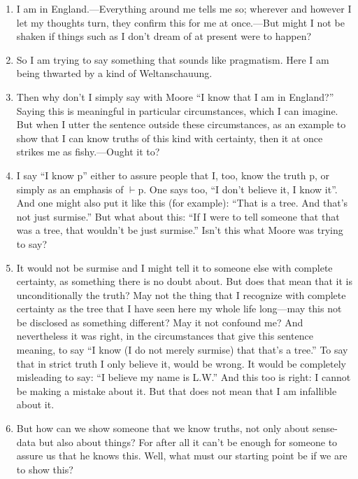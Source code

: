 \documentclass{book}
\begin{document}
\begin{enumerate}
\item
I am in England.---Everything around me tells me so; wherever and however I let
my thoughts turn, they confirm this for me at once.---But might I not be shaken
if things such as I don't dream of at present were to happen?

\item
So I am trying to say something that sounds like pragmatism.  Here I am being
thwarted by a kind of Weltanschauung.

\item
Then why don't I simply say with Moore ``I know that I am in England?'' Saying
this is meaningful in particular circumstances, which I can imagine. But when I
utter the sentence outside these circumstances, as an example to show that I
can know truths of this kind with certainty, then it at once strikes me as
fishy.---Ought it to?

\item
I say ``I know p'' either to assure people that I, too, know the truth p, or
simply as an emphasis of $\vdash$p. One says too, ``I don't believe it, I know
it''.  And one might also put it like this (for example): ``That is a tree. And
that's not just surmise.'' But what about this: ``If I were to tell someone
that that was a tree, that wouldn't be just surmise.'' Isn't this what Moore
was trying to say?

\item
It would not be surmise and I might tell it to someone else with complete
certainty, as something there is no doubt about. But does that mean that it is
unconditionally the truth? May not the thing that I recognize with complete
certainty as the tree that I have seen here my whole life long---may this not
be disclosed as something different? May it not confound me?  And nevertheless
it was right, in the circumstances that give this sentence meaning, to say ``I
know (I do not merely surmise) that that's a tree.'' To say that in strict
truth I only believe it, would be wrong. It would be completely misleading to
say: ``I believe my name is L.W.'' And this too is right: I cannot be making a
mistake about it. But that does not mean that I am infallible about it.

\item
But how can we show someone that we know truths, not only about sense-data but
also about things? For after all it can't be enough for someone to assure us
that he knows this.  Well, what must our starting point be if we are to show
this?


\end{enumerate}
\end{document}
